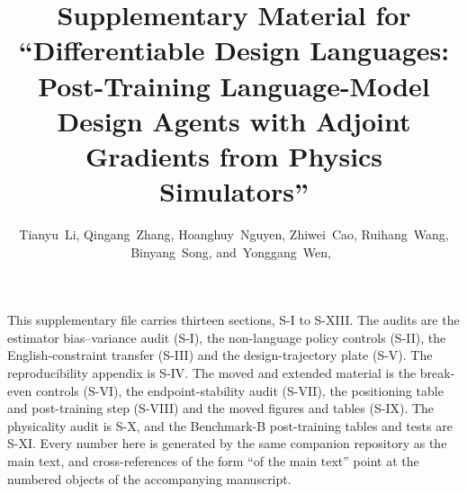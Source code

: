 \documentclass[journal]{IEEEtran}
\newif\ifblindreview
\begin{document}
\title{Supplementary Material for ``Differentiable Design Languages: Post-Training Language-Model Design Agents with Adjoint Gradients from Physics Simulators''}
\ifblindreview
\author{Anonymous Authors}
\else
\author{Tianyu~Li, Qingang~Zhang, Hoanghuy~Nguyen, Zhiwei~Cao, Ruihang~Wang, Binyang~Song, and~Yonggang~Wen,~}
\fi
\maketitle
\ifblindreview
\markboth{IEEE Transactions on Neural Networks and Learning Systems}{Anonymous submission --- Supplementary Material}
\else
{}
\fi
This supplementary file carries thirteen sections, S-I to S-XIII.  The audits are
the estimator bias--variance audit (S-I), the non-language policy controls
(S-II), the English-constraint transfer (S-III) and the design-trajectory plate
(S-V).  The reproducibility appendix is S-IV.  The moved and extended material
is the break-even controls (S-VI), the endpoint-stability audit (S-VII), the
positioning table and post-training step (S-VIII) and the moved figures and
tables (S-IX).  The physicality audit is S-X, and the Benchmark-B post-training
tables and tests are S-XI.  Every number here is generated by the same
companion repository as the main text, and cross-references of the form
``of the main text'' point at the numbered objects of the accompanying manuscript.



\FloatBarrier

\ifblindreview\else\fi
\end{document}
